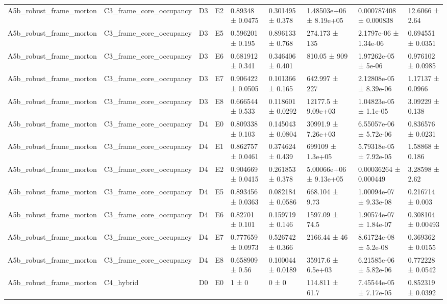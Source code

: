 \begin{table}
\begin{tabular}{lllllllll}
A5b\_robust\_frame\_morton & C3\_frame\_core\_occupancy & D3 & E2 & 0.89348 ± 0.0475 & 0.301495 ± 0.378 & 1.48503e+06 ± 8.19e+05 & 0.000787408 ± 0.000838 & 12.6066 ± 2.64 \\
A5b\_robust\_frame\_morton & C3\_frame\_core\_occupancy & D3 & E5 & 0.596201 ± 0.195 & 0.896133 ± 0.768 & 274.173 ± 135 & 2.1797e-06 ± 1.34e-06 & 0.694551 ± 0.0351 \\
A5b\_robust\_frame\_morton & C3\_frame\_core\_occupancy & D3 & E6 & 0.681912 ± 0.341 & 0.346406 ± 0.401 & 810.05 ± 909 & 1.97262e-05 ± 5e-06 & 0.976102 ± 0.0985 \\
A5b\_robust\_frame\_morton & C3\_frame\_core\_occupancy & D3 & E7 & 0.906422 ± 0.0505 & 0.101366 ± 0.165 & 642.997 ± 227 & 2.12808e-05 ± 8.39e-06 & 1.17137 ± 0.0966 \\
A5b\_robust\_frame\_morton & C3\_frame\_core\_occupancy & D3 & E8 & 0.666544 ± 0.533 & 0.118601 ± 0.0292 & 12177.5 ± 9.09e+03 & 1.04823e-05 ± 1.1e-05 & 3.09229 ± 0.138 \\
A5b\_robust\_frame\_morton & C3\_frame\_core\_occupancy & D4 & E0 & 0.809338 ± 0.103 & 0.145043 ± 0.0804 & 30991.9 ± 7.26e+03 & 6.55057e-06 ± 5.72e-06 & 0.836576 ± 0.0231 \\
A5b\_robust\_frame\_morton & C3\_frame\_core\_occupancy & D4 & E1 & 0.862757 ± 0.0461 & 0.374624 ± 0.439 & 699109 ± 1.3e+05 & 5.79318e-05 ± 7.92e-05 & 1.58868 ± 0.186 \\
A5b\_robust\_frame\_morton & C3\_frame\_core\_occupancy & D4 & E2 & 0.904669 ± 0.0415 & 0.261853 ± 0.378 & 5.00066e+06 ± 9.13e+05 & 0.00036264 ± 0.000449 & 3.28598 ± 2.62 \\
A5b\_robust\_frame\_morton & C3\_frame\_core\_occupancy & D4 & E5 & 0.893456 ± 0.0363 & 0.082184 ± 0.0586 & 668.104 ± 9.73 & 1.00094e-07 ± 9.33e-08 & 0.216714 ± 0.003 \\
A5b\_robust\_frame\_morton & C3\_frame\_core\_occupancy & D4 & E6 & 0.82701 ± 0.101 & 0.159719 ± 0.146 & 1597.09 ± 74.5 & 1.90574e-07 ± 1.84e-07 & 0.308104 ± 0.00493 \\
A5b\_robust\_frame\_morton & C3\_frame\_core\_occupancy & D4 & E7 & 0.777659 ± 0.0973 & 0.526742 ± 0.366 & 2166.44 ± 46 & 8.61724e-08 ± 5.2e-08 & 0.369362 ± 0.0155 \\
A5b\_robust\_frame\_morton & C3\_frame\_core\_occupancy & D4 & E8 & 0.658909 ± 0.56 & 0.100044 ± 0.0189 & 35917.6 ± 6.5e+03 & 6.21585e-06 ± 5.82e-06 & 0.772228 ± 0.0542 \\
A5b\_robust\_frame\_morton & C4\_hybrid & D0 & E0 & 1 ± 0 & 0 ± 0 & 114.811 ± 61.7 & 7.45544e-05 ± 7.17e-05 & 0.852319 ± 0.0392 \\

\end{tabular}
\end{table}
